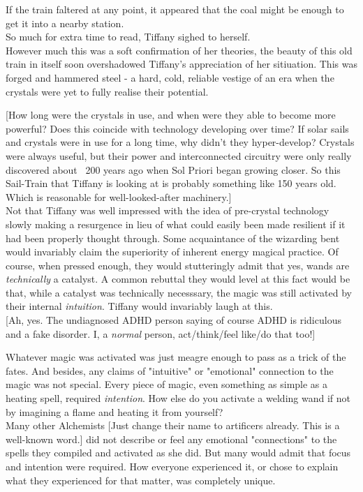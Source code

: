 If the train faltered at any point, it appeared that the coal might be enough to get it into a nearby station.\\

So much for extra time to read, Tiffany sighed to herself.\\

However much this was a soft confirmation of her theories, the beauty of this old train in itself soon overshadowed Tiffany's appreciation of her sitiuation.
This was forged and hammered steel - a hard, cold, reliable vestige of an era when the crystals were yet to fully realise their potential. 

[How long were the crystals in use, and when were they able to become more powerful? 
Does this coincide with technology developing over time?
If solar sails and crystals were in use for a long time, why didn't they hyper-develop?
Crystals were always useful, but their power and interconnected circuitry were only really discovered about ~200 years ago when Sol Priori began growing closer.
So this Sail-Train that Tiffany is looking at is probably something like 150 years old.
Which is reasonable for well-looked-after machinery.]\\

Not that Tiffany was well impressed with the idea of pre-crystal technology slowly making a resurgence in lieu of what could easily been made resilient if it had been properly thought through.
Some acquaintance of the wizarding bent would invariably claim the superiority of inherent energy magical practice.
Of course, when pressed enough, they would stutteringly admit that yes, wands are \textit{technically} a catalyst.
A common rebuttal they would level at this fact would be that, while a catalyst was technically necesssary, the magic was still activated by their internal \textit{intuition}.
Tiffany would invariably laugh at this.\\

[Ah, yes. The undiagnosed ADHD person saying of course ADHD is ridiculous and a fake disorder. I, a \textit{normal} person, act/think/feel like/do that too!]

Whatever magic was activated was just meagre enough to pass as a trick of the fates.
And besides, any claims of "intuitive" or "emotional" connection to the magic was not special.
Every piece of magic, even something as simple as a heating spell, required \textit{intention}.
How else do you activate a welding wand if not by imagining a flame and heating it from yourself?\\

Many other Alchemists [Just change their name to artificers already. This is a well-known word.] did not describe or feel any emotional "connections" to the spells they compiled and activated as she did.
But many would admit that focus and intention were required.
How everyone experienced it, or chose to explain what they experienced for that matter, was completely unique.
